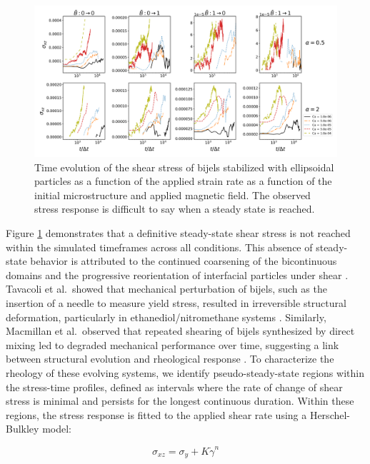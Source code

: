 \begin{figure} 
    \centering 
    \includegraphics[scale=0.5]{../figures/results/paper3/stress-time_compare.png} 
    \caption{Time evolution of the shear stress of bijels stabilized with ellipsoidal particles as a function of the applied strain rate as
             a function of the initial microstructure and applied magnetic field. The observed stress response is difficult to say when a steady
             state is reached.} 
    \label{fig:stress_time} 
\end{figure}

Figure \ref{fig:stress_time} demonstrates that a definitive steady-state shear stress is not reached within the simulated timeframes across all conditions. 
This absence of steady-state behavior is attributed to the continued coarsening of the bicontinuous domains and the progressive reorientation of interfacial 
particles under shear \cite{tavacoli_novel_2011, macmillan_rheological_2019}. Tavacoli et al.\ showed that mechanical perturbation of bijels, such as the 
insertion of a needle to measure yield stress, resulted in irreversible structural deformation, particularly in ethanediol/nitromethane systems 
\cite{tavacoli_novel_2011}. Similarly, Macmillan et al.\ observed that repeated shearing of bijels synthesized by direct mixing led to degraded mechanical 
performance over time, suggesting a link between structural evolution and rheological response \cite{macmillan_rheological_2019}. To characterize the rheology 
of these evolving systems, we identify pseudo-steady-state regions within the stress-time profiles, defined as intervals where the rate of change of shear 
stress is minimal and persists for the longest continuous duration. Within these regions, the stress response is fitted to the applied shear rate using a 
Herschel-Bulkley model:  

\begin{equation}
    \sigma_{xz} = \sigma_{y} + K\dot{\gamma}^{n}    
\end{equation}

